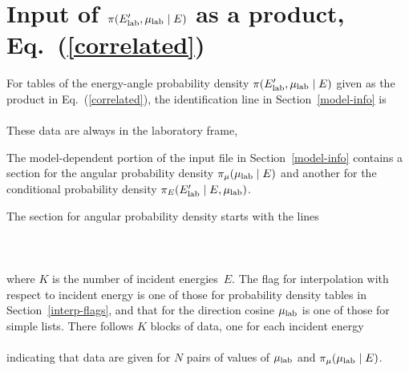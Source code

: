 \\
 \\
\\
\\
\\
\\
\\
\\
\\
\\

\section{Input of $\pi(E_{\text{lab}}', \mu_{\text{lab}} \mid E)$ as a product, Eq.~(\ref{correlated})}
For tables of the energy-angle probability density $\pi(E_{\text{lab}}', \mu_{\text{lab}} \mid E)$
given as the product in Eq.~(\ref{correlated}), the identification line in
Section~\ref{model-info} is\\
      \\
These data are always in the laboratory frame,\\

The model-dependent portion of the input file in Section~\ref{model-info}
contains a section for the angular probability density $\pi_\mu(\mu_{\text{lab}} \mid E)$
and another for the conditional probability density $\pi_E(E_{\text{lab}}' \mid E, \mu_{\text{lab}})$.

The section for angular probability density starts with the lines\\
  \\
  \\
  \\
where $K$ is the number of incident energies~$E$.  The flag for
interpolation with respect to incident energy is one of those for
probability density tables in Section~\ref{interp-flags}, and that for 
the direction cosine $\mu_{\text{lab}}$ is one of those 
for simple lists.  There follows $K$ blocks of data,
one for each incident energy\\
    \\
indicating that data are given for $N$ pairs of values of $\mu_{\text{lab}}$
and $\pi_\mu(\mu_{\text{lab}} \mid E)$.

